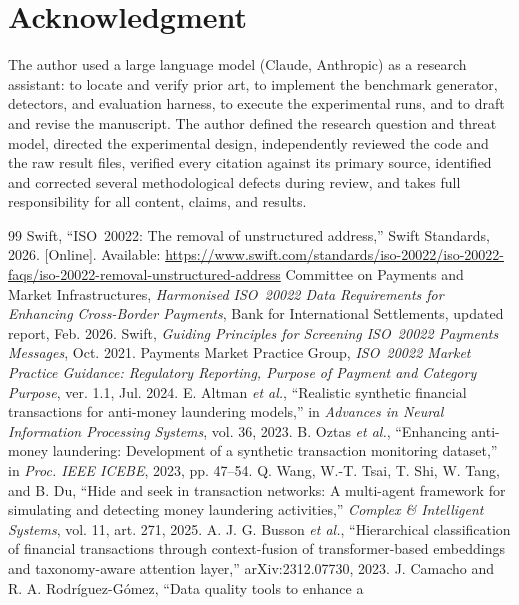 \documentclass[conference]{IEEEtran}
\begin{document}
\section*{Acknowledgment}
The author used a large language model (Claude, Anthropic) as a research
assistant: to locate and verify prior art, to implement the benchmark
generator, detectors, and evaluation harness, to execute the experimental runs,
and to draft and revise the manuscript. The author defined the research
question and threat model, directed the experimental design, independently
reviewed the code and the raw result files, verified every citation against its
primary source, identified and corrected several methodological defects during
review, and takes full responsibility for all content, claims, and results.
 
\balance
\begin{thebibliography}{99}
\scriptsize
\setlength{\itemsep}{0pt plus 0.2pt}
Swift, ``ISO~20022: The removal of unstructured address,'' Swift Standards,
2026. [Online]. Available:
\url{https://www.swift.com/standards/iso-20022/iso-20022-faqs/iso-20022-removal-unstructured-address}
Committee on Payments and Market Infrastructures, \emph{Harmonised ISO~20022
Data Requirements for Enhancing Cross-Border Payments}, Bank for International
Settlements, updated report, Feb. 2026.
Swift, \emph{Guiding Principles for Screening ISO~20022 Payments Messages},
Oct. 2021.
Payments Market Practice Group, \emph{ISO~20022 Market Practice Guidance:
Regulatory Reporting, Purpose of Payment and Category Purpose}, ver. 1.1, Jul.
2024.
E. Altman \emph{et al.}, ``Realistic synthetic financial transactions for
anti-money laundering models,'' in \emph{Advances in Neural Information
Processing Systems}, vol. 36, 2023.
B. Oztas \emph{et al.}, ``Enhancing anti-money laundering: Development of a
synthetic transaction monitoring dataset,'' in \emph{Proc. IEEE ICEBE}, 2023,
pp. 47--54.
Q. Wang, W.-T. Tsai, T. Shi, W. Tang, and B. Du, ``Hide and seek in
transaction networks: A multi-agent framework for simulating and detecting
money laundering activities,'' \emph{Complex \& Intelligent Systems}, vol. 11,
art. 271, 2025.
A. J. G. Busson \emph{et al.}, ``Hierarchical classification of financial
transactions through context-fusion of transformer-based embeddings and
taxonomy-aware attention layer,'' arXiv:2312.07730, 2023.
J. Camacho and R. A. Rodr\'iguez-G\'omez, ``Data quality tools to enhance a

\end{thebibliography}
\end{document}
